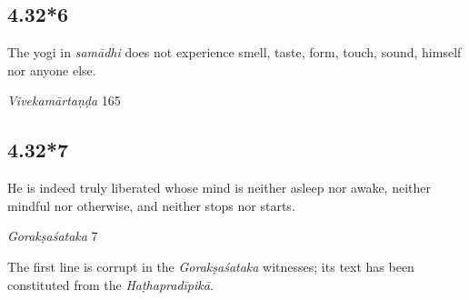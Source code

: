 \begin{ekdosis}
\subsection*{4.32*6}
\begin{translation}[hp04_032_6]
The yogi in \textit{samādhi} does not experience smell, taste, form, touch, sound, himself nor anyone else.
\end{translation}

\begin{sources}[hp04_032_6]
\emph{Vivekamārtaṇḍa} 165
\begin{versinnote}
\end{versinnote}
\end{sources}



\subsection*{4.32*7}
\begin{translation}[hp04_032_7]
He is indeed truly liberated whose mind is neither asleep nor awake, neither mindful nor otherwise, and neither stops nor starts.
\end{translation}

\begin{sources}[hp04_032_7]
\emph{Gorakṣaśataka} 7
\begin{versinnote}
\end{versinnote}
\end{sources}


\begin{philcomm}[hp04_032_7]
The first line is corrupt in the \emph{Gorakṣaśataka} witnesses; its text has been constituted from the \emph{Haṭhapradīpikā}.
\end{philcomm}


\end{ekdosis}

